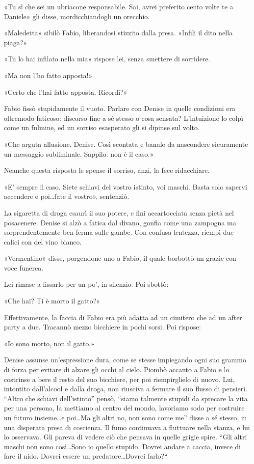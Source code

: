 «Tu sì che sei un ubriacone responsabile. Sai, avrei preferito cento volte te a Daniele» gli disse, mordicchiandogli un orecchio.

«Maledetta» sibilò Fabio, liberandosi stizzito dalla presa. «Infili il dito nella piaga?»

«Tu lo hai infilato nella mia» rispose lei, senza smettere di sorridere.

«Ma non l'ho fatto apposta!»

«Certo che l'hai fatto apposta. Ricordi?»

Fabio fissò stupidamente il vuoto. Parlare con Denise in quelle condizioni era oltremodo faticoso: discorso fine a sé stesso o cosa sensata? L'intuizione lo colpì come un fulmine, ed un sorriso esasperato gli si dipinse sul volto.

«Che arguta allusione, Denise. Così scontata e banale da nascondere sicuramente un messaggio subliminale. Sappilo: non è il caso.»

Neanche questa risposta le spense il sorriso, anzi, la fece ridacchiare.

«E' sempre il caso. Siete schiavi del vostro istinto, voi maschi. Basta solo sapervi accendere e poi\ldots fate il vostro», sentenziò.

La sigaretta di droga esaurì il suo potere, e finì accartocciata senza pietà nel posacenere. Denise si alzò a fatica dal divano, gonfia come una zampogna ma sorprendentemente ben ferma sulle gambe. Con confusa lentezza, riempì due calici con del vino bianco.

«Vermentino» disse, porgendone uno a Fabio, il quale borbottò un grazie con voce funerea.

Lei rimase a fissarlo per un po', in silenzio. Poi sbottò:

«Che hai? Ti è morto il gatto?»

Effettivamente, la faccia di Fabio era più adatta ad un cimitero che ad un after party a due. Tracannò mezzo bicchiere in pochi sorsi. Poi rispose:

«Io sono morto, non il gatto.»

Denise assunse un'espressione dura, come se stesse impiegando ogni suo grammo di forza per evitare di alzare gli occhi al cielo. Piombò accanto a Fabio e lo costrinse a bere il resto del suo bicchiere, per poi riempirglielo di nuovo. Lui, intontito dall'alcool e dalla droga, non riusciva a fermare il suo flusso di pensieri. ``Altro che schiavi dell'istinto'' pensò, ``siamo talmente stupidi da sprecare la vita per una persona, la mettiamo al centro del mondo, lavoriamo sodo per costruire un futuro insieme\ldots e poi\ldots Ma gli altri no, non sono come me'' disse a sé stesso, in una disperata presa di coscienza. Il fumo continuava a fluttuare nella stanza, e lui lo osservava. Gli pareva di vedere ciò che pensava in quelle grigie spire. ``Gli altri maschi non sono così\ldots Sono io quello stupido. Dovrei andare a caccia, invece di fare il nido. Dovrei essere un predatore\ldots Dovrei farlo?``

